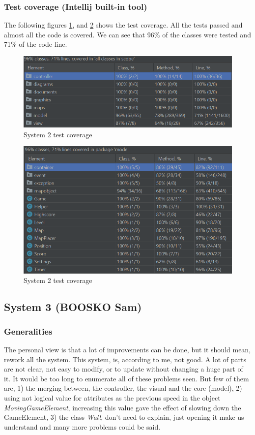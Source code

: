 \documentclass[]{article}
\begin{document}
\subsubsection{Test coverage (Intellij built-in tool)}

The following figures \ref{fig:acov},  and \ref{fig:acov2} shows the test coverage. All the tests passed and almost all the code is covered. We can see that 96\% of the classes were tested and 71\% of the code line. 
\newpage

\begin{figure}[h!]
\centering
\includegraphics[width=0.75\linewidth]{testCovS2.png}
\caption{System 2 test coverage}
\label{fig:acov}
\end{figure}

\begin{figure}[h!]
\centering
\includegraphics[width=0.75\linewidth]{testCov2S2.png}
\caption{System 2 test coverage}
\label{fig:acov2}
\end{figure}
\newpage

\subsection{System 3 (BOOSKO Sam)}

\subsubsection{Generalities}

The personal view is that a lot of improvements can be done, but it should mean, rework all the system. This system, is, according to me, not good. A lot of parts are not clear, not easy to modify, or to update without changing a huge part of it. It would be too long to enumerate all of these problems seen. But few of them are, 1) the merging between, the controller, the visual and the core (model), 2) using not logical value for attributes as the previous speed in the object \textit{MovingGameElement}, increasing this value gave the effect of slowing down the GameElement, 3) the class \textit{Wall}, don't need to explain, just opening it make us understand and many more problems could be said.\\
\end{document}
